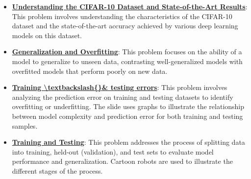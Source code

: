 \documentclass{article}%
\begin{document}
\begin{itemize}[leftmargin=*]
\item \href{https://purdue.brightspace.com/d2l/common/assets/pdfjs-d2l-dist/1.0.14-legacy/web/viewer.html?file=\%2Fcontent\%2Fenforced\%2F1095467-wl.202510.CS.24300.001\%2F09L1-cnn.pdf\%3Fou\%3D1095467\&lang=en-us\&container=d2l-fileviewer-rendered-pdf\&fullscreen=d2l-fileviewer-rendered-pdf-dialog\&height=667#page=23}{\textbf{Understanding the CIFAR{-}10 Dataset and State{-}of{-}the{-}Art Results}}: This problem involves understanding the characteristics of the CIFAR-10 dataset and the state-of-the-art accuracy achieved by various deep learning models on this dataset.%
\end{itemize}%
\begin{itemize}[leftmargin=*]%
\item \href{https://purdue.brightspace.com/d2l/common/assets/pdfjs-d2l-dist/1.0.14-legacy/web/viewer.html?file=\%2Fcontent\%2Fenforced\%2F1095467-wl.202510.CS.24300.001\%2F10L1-CrossValidation.pdf\%3Fou\%3D1095467\&lang=en-us\&container=d2l-fileviewer-rendered-pdf\&fullscreen=d2l-fileviewer-rendered-pdf-dialog\&height=667#page=2}{\textbf{Generalization and Overfitting}}: This problem focuses on the ability of a model to generalize to unseen data, contrasting well-generalized models with overfitted models that perform poorly on new data.%
\item \href{https://purdue.brightspace.com/d2l/common/assets/pdfjs-d2l-dist/1.0.14-legacy/web/viewer.html?file=\%2Fcontent\%2Fenforced\%2F1095467-wl.202510.CS.24300.001\%2F10L1-CrossValidation.pdf\%3Fou\%3D1095467\&lang=en-us\&container=d2l-fileviewer-rendered-pdf\&fullscreen=d2l-fileviewer-rendered-pdf-dialog\&height=667#page=4}{\textbf{Training \textbackslash{}textbackslash\{\}\& testing errors}}: This problem involves analyzing the prediction error on training and testing datasets to identify overfitting or underfitting. The slide uses graphs to illustrate the relationship between model complexity and prediction error for both training and testing samples.%
\item \href{https://purdue.brightspace.com/d2l/common/assets/pdfjs-d2l-dist/1.0.14-legacy/web/viewer.html?file=\%2Fcontent\%2Fenforced\%2F1095467-wl.202510.CS.24300.001\%2F10L1-CrossValidation.pdf\%3Fou\%3D1095467\&lang=en-us\&container=d2l-fileviewer-rendered-pdf\&fullscreen=d2l-fileviewer-rendered-pdf-dialog\&height=667#page=5}{\textbf{Training and Testing}}: This problem addresses the process of splitting data into training, held-out (validation), and test sets to evaluate model performance and generalization. Cartoon robots are used to illustrate the different stages of the process.%

\end{itemize}
\end{document}
